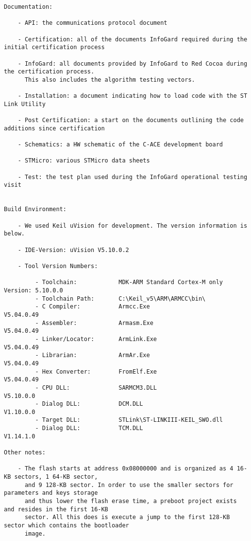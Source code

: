 \documentclass{article}
\begin{document}
\begin{Verbatim}[fontsize=\small,highlightcolor=lightgray,highlightlines={5,38,58,78}]
Documentation:

    - API: the communications protocol document

    - Certification: all of the documents InfoGard required during the initial certification process

    - InfoGard: all documents provided by InfoGard to Red Cocoa during the certification process.
      This also includes the algorithm testing vectors.

    - Installation: a document indicating how to load code with the ST Link Utility

    - Post Certification: a start on the documents outlining the code additions since certification

    - Schematics: a HW schematic of the C-ACE development board

    - STMicro: various STMicro data sheets

    - Test: the test plan used during the InfoGard operational testing visit


Build Environment:

    - We used Keil uVision for development. The version information is below.

    - IDE-Version: uVision V5.10.0.2

    - Tool Version Numbers:

         - Toolchain:            MDK-ARM Standard Cortex-M only  Version: 5.10.0.0
         - Toolchain Path:       C:\Keil_v5\ARM\ARMCC\bin\
         - C Compiler:           Armcc.Exe                                V5.04.0.49
         - Assembler:            Armasm.Exe                               V5.04.0.49
         - Linker/Locator:       ArmLink.Exe                              V5.04.0.49
         - Librarian:            ArmAr.Exe                                V5.04.0.49
         - Hex Converter:        FromElf.Exe                              V5.04.0.49
         - CPU DLL:              SARMCM3.DLL                              V5.10.0.0
         - Dialog DLL:           DCM.DLL                                  V1.10.0.0
         - Target DLL:           STLink\ST-LINKIII-KEIL_SWO.dll
         - Dialog DLL:           TCM.DLL                                  V1.14.1.0

Other notes:

    - The flash starts at address 0x08000000 and is organized as 4 16-KB sectors, 1 64-KB sector,
      and 9 128-KB sector. In order to use the smaller sectors for parameters and keys storage
      and thus lower the flash erase time, a preboot project exists and resides in the first 16-KB
      sector. All this does is execute a jump to the first 128-KB sector which contains the bootloader
      image.


\end{Verbatim}
\end{document}
